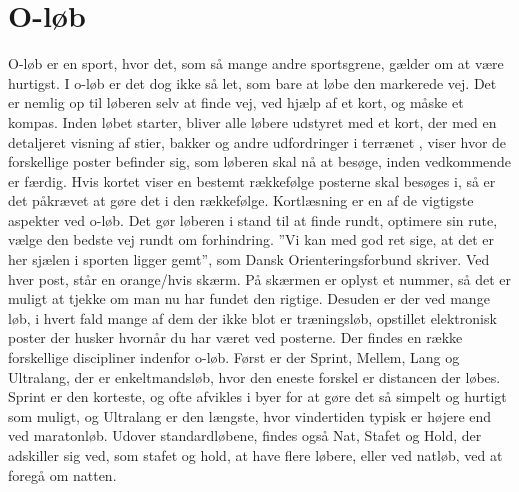 \section{O-løb}
O-løb er en sport, hvor det, som så mange andre sportsgrene, gælder om at være hurtigst. I o-løb er det dog ikke så let, som bare at løbe den markerede vej. Det er nemlig op til løberen selv at finde vej, ved hjælp af et kort, og måske et kompas.  
Inden løbet starter, bliver alle løbere udstyret med et kort, der med en detaljeret visning af stier, bakker og andre udfordringer i terrænet , viser hvor de forskellige poster befinder sig, som løberen skal nå at besøge, inden vedkommende er færdig. Hvis kortet viser en bestemt rækkefølge posterne skal besøges i, så er det påkrævet at gøre det i den rækkefølge. 
Kortlæsning er en af de vigtigste aspekter ved o-løb. Det gør løberen i stand til at finde rundt, optimere sin rute, vælge den bedste vej rundt om forhindring. ”Vi kan med god ret sige, at det er her sjælen i sporten ligger gemt”, som Dansk Orienteringsforbund skriver.   
Ved hver post, står en  orange/hvis skærm. På skærmen er oplyst et nummer, så det er muligt at tjekke om man nu har fundet den rigtige. Desuden er der ved mange løb, i hvert fald mange af dem der ikke blot er træningsløb, opstillet elektronisk poster der husker hvornår du har været ved posterne. 
Der findes en række forskellige discipliner indenfor o-løb. Først er der Sprint, Mellem, Lang og  Ultralang, der er enkeltmandsløb, hvor den eneste forskel er distancen der løbes. Sprint er den korteste, og ofte afvikles i byer for at gøre det så simpelt og hurtigt som muligt, og Ultralang er den længste, hvor vindertiden typisk er højere end ved maratonløb. 
Udover standardløbene, findes også Nat, Stafet og Hold, der adskiller sig ved, som stafet og hold, at have flere løbere, eller ved natløb, ved at foregå om natten. 
